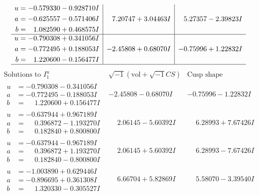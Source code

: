 \documentclass[1p]{elsarticle_modified}
\theoremstyle{definition}
\newcommand{\I}{\sqrt{-1}}
\begin{document}
$$\begin{array}{c|c|c}
\begin{aligned}
u &= -0.579330 - 0.928710 I \\
a &= -0.625557 - 0.571406 I \\
b &= \phantom{-}1.082590 + 0.468575 I\end{aligned}
 & \phantom{-}7.20747 + 3.04463 I & \phantom{-}5.27357 - 2.39823 I \\ \hline\begin{aligned}
u &= -0.790308 + 0.341056 I \\
a &= -0.772495 + 0.188053 I \\
b &= \phantom{-}1.220600 - 0.156477 I\end{aligned}
 & -2.45808 + 0.68070 I & -0.75996 + 1.22832 I\\
 \hline 
 \end{array}$$\newpage$$\begin{array}{c|c|c}  
\text{Solutions to }I^u_{1}& \I (\text{vol} + \sqrt{-1}CS) & \text{Cusp shape}\\
 \hline 
\begin{aligned}
u &= -0.790308 - 0.341056 I \\
a &= -0.772495 - 0.188053 I \\
b &= \phantom{-}1.220600 + 0.156477 I\end{aligned}
 & -2.45808 - 0.68070 I & -0.75996 - 1.22832 I \\ \hline\begin{aligned}
u &= -0.637944 + 0.967189 I \\
a &= \phantom{-}0.396872 - 1.193270 I \\
b &= \phantom{-}0.182840 + 0.800800 I\end{aligned}
 & \phantom{-}2.06145 - 5.60392 I & \phantom{-}6.28993 + 7.67426 I \\ \hline\begin{aligned}
u &= -0.637944 - 0.967189 I \\
a &= \phantom{-}0.396872 + 1.193270 I \\
b &= \phantom{-}0.182840 - 0.800800 I\end{aligned}
 & \phantom{-}2.06145 + 5.60392 I & \phantom{-}6.28993 - 7.67426 I \\ \hline\begin{aligned}
u &= -1.003890 + 0.629446 I \\
a &= -0.896695 + 0.361308 I \\
b &= \phantom{-}1.320330 - 0.305527 I\end{aligned}
 & \phantom{-}6.66704 + 5.82869 I & \phantom{-}5.58070 - 3.39540 I \\ \hline\begin{aligned}

\end{aligned}
\end{array}$$
\end{document}
